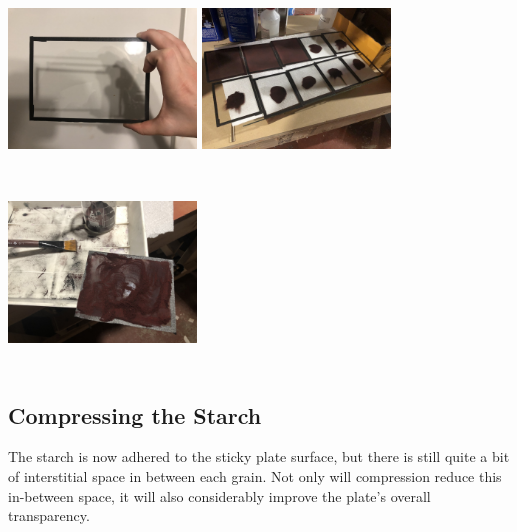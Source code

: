 \documentclass[11pt]{article}
\begin{document}
\begin{center}
\includegraphics[width=5cm, height=5cm]{img/part1_17.jpg}
\includegraphics[width=5cm, height=5cm]{img/part1_18.jpg}
\includegraphics[width=5cm, height=5cm]{img/part1_19.jpg}
\end{center}

\subsection{Compressing the Starch}

The starch is now adhered to the sticky plate surface, but there is still quite a bit of interstitial space in between each grain. Not only will compression reduce this in-between space, it will also considerably improve the plate's overall transparency.\newline
\end{document}

